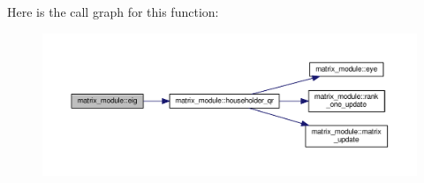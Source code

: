Here is the call graph for this function\-:\nopagebreak
\begin{figure}[H]
\begin{center}
\leavevmode
\includegraphics[width=350pt]{classmatrix__module_a0aed5ffb6e05b3425093d49b7b08a084_cgraph}
\end{center}
\end{figure}



